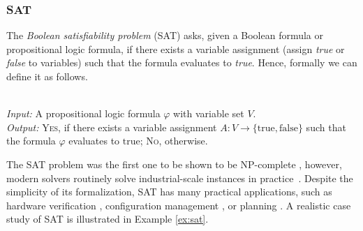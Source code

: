 \documentclass[twoside,11pt]{article}
\begin{document}
\subsubsection{SAT}
The \emph{Boolean satisfiability problem} (SAT) asks, given a Boolean formula or propositional logic formula, if there exists a variable assignment (assign \emph{true} or \emph{false} to variables) such that the formula evaluates to \emph{true}. Hence, formally we can define it as follows.
\begin{definition}[SAT]\hspace{1pt}\\
	\textit{Input:} A propositional logic formula $\varphi$ with variable set $V$.\\
	\textit{Output:} \textsc{Yes}, if there exists a variable assignment $A \colon V \to \{ \text{true}, \text{false} \}$ such that the formula $\varphi$ evaluates to $\text{true}$; \textsc{No}, otherwise.
\end{definition}
The SAT problem was the first one to be shown to be \textsf{NP}-complete \citep{cook1971complexity}, however, modern solvers routinely solve industrial-scale instances in practice~\citep{Pra+2005}.
Despite the simplicity of its formalization, SAT has many practical applications, such as hardware verification 
\citep{clarke2003sat,gupta2006sat}, configuration management \citep{mancinelli2006managing,tucker2007opium}, or planning \citep{behnke2018totsat}. A realistic case study of SAT is illustrated in Example \ref{ex:sat}. 
\end{document}
